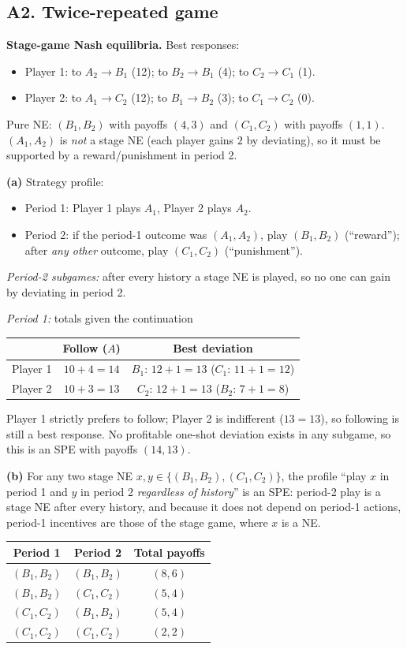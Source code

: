 \documentclass[11pt]{article}
\begin{document}
\subsection*{A2. Twice-repeated game}
\textbf{Stage-game Nash equilibria.} Best responses:
\begin{itemize}
  \item Player 1: to $A_2\to B_1$ (12); to $B_2\to B_1$ (4); to $C_2\to C_1$ (1).
  \item Player 2: to $A_1\to C_2$ (12); to $B_1\to B_2$ (3); to $C_1\to C_2$ (0).
\end{itemize}
Pure NE: $(B_1,B_2)$ with payoffs $(4,3)$ and $(C_1,C_2)$ with payoffs $(1,1)$. $(A_1,A_2)$ is \emph{not} a stage NE (each player gains $2$ by deviating), so it must be supported by a reward/punishment in period 2.

\textbf{(a)} Strategy profile:
\begin{itemize}
  \item Period 1: Player 1 plays $A_1$, Player 2 plays $A_2$.
  \item Period 2: if the period-1 outcome was $(A_1,A_2)$, play $(B_1,B_2)$ (``reward''); after \emph{any other} outcome, play $(C_1,C_2)$ (``punishment'').
\end{itemize}
\emph{Period-2 subgames:} after every history a stage NE is played, so no one can gain by deviating in period 2.

\emph{Period 1:} totals given the continuation
\begin{center}
\begin{tabular}{l|c|c}
  & Follow ($A$) & Best deviation \\ \hline
  Player 1 & $10+4=14$ & $B_1$: $12+1=13$ \quad ($C_1$: $11+1=12$) \\
  Player 2 & $10+3=13$ & $C_2$: $12+1=13$ \quad ($B_2$: $7+1=8$)
\end{tabular}
\end{center}
Player 1 strictly prefers to follow; Player 2 is indifferent ($13=13$), so following is still a best response. No profitable one-shot deviation exists in any subgame, so this is an SPE with payoffs $(14,13)$.

\textbf{(b)} For any two stage NE $x,y\in\{(B_1,B_2),(C_1,C_2)\}$, the profile ``play $x$ in period 1 and $y$ in period 2 \emph{regardless of history}'' is an SPE: period-2 play is a stage NE after every history, and because it does not depend on period-1 actions, period-1 incentives are those of the stage game, where $x$ is a NE.
\begin{center}
\begin{tabular}{c|c|c}
  Period 1 & Period 2 & Total payoffs \\ \hline
  $(B_1,B_2)$ & $(B_1,B_2)$ & $(8,6)$ \\
  $(B_1,B_2)$ & $(C_1,C_2)$ & $(5,4)$ \\
  $(C_1,C_2)$ & $(B_1,B_2)$ & $(5,4)$ \\
  $(C_1,C_2)$ & $(C_1,C_2)$ & $(2,2)$
\end{tabular}
\end{center}
\end{document}
